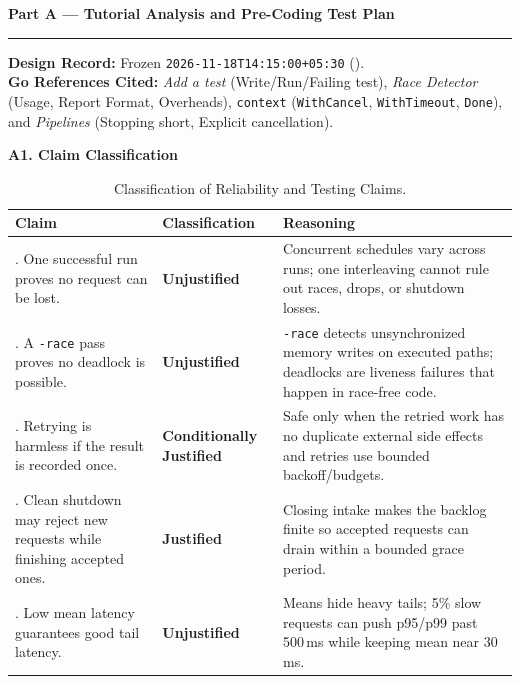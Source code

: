 \documentclass[11pt]{article}
\newcommand{\partheader}[1]{%
    \vspace{1.0em}%
    {\noindent\fontsize{13.5}{16}\selectfont\textbf{\color{accentblue}#1}\par}%
    \vspace{0.2em}\hrule\vspace{0.7em}%
}
\newcommand{\subhead}[1]{\vspace{0.6em}\noindent\textbf{\large #1}\par\vspace{0.25em}}
\begin{document}
\partheader{Part A --- Tutorial Analysis and Pre-Coding Test Plan}

\textbf{Design Record:} Frozen \texttt{2026-11-18T14:15:00+05:30} ().\\
\textbf{Go References Cited:} \textit{Add a test} (Write/Run/Failing test), \textit{Race Detector} (Usage, Report Format, Overheads), \texttt{context} (\texttt{WithCancel}, \texttt{WithTimeout}, \texttt{Done}), and \textit{Pipelines} (Stopping short, Explicit cancellation).

\subhead{A1. Claim Classification}
\begin{table}[htbp]
\centering
\caption{Classification of Reliability and Testing Claims.}
\footnotesize
\begin{tabularx}{\textwidth}{@{} >{\raggedright\arraybackslash}p{4.3cm} >{\raggedright\arraybackslash}p{2.1cm} >{\raggedright\arraybackslash}X @{}}
\toprule
\textbf{Claim} & \textbf{Classification} & \textbf{Reasoning} \\
\midrule
1. One successful run proves no request can be lost. & \textbf{Unjustified} & Concurrent schedules vary across runs; one interleaving cannot rule out races, drops, or shutdown losses. \\
2. A \texttt{-race} pass proves no deadlock is possible. & \textbf{Unjustified} & \texttt{-race} detects unsynchronized memory writes on executed paths; deadlocks are liveness failures that happen in race-free code. \\
3. Retrying is harmless if the result is recorded once. & \textbf{Conditionally Justified} & Safe only when the retried work has no duplicate external side effects and retries use bounded backoff/budgets. \\
4. Clean shutdown may reject new requests while finishing accepted ones. & \textbf{Justified} & Closing intake makes the backlog finite so accepted requests can drain within a bounded grace period. \\
5. Low mean latency guarantees good tail latency. & \textbf{Unjustified} & Means hide heavy tails; 5\% slow requests can push p95/p99 past 500\,ms while keeping mean near 30\,ms. \\
\bottomrule
\end{tabularx}
\end{table}
\end{document}
